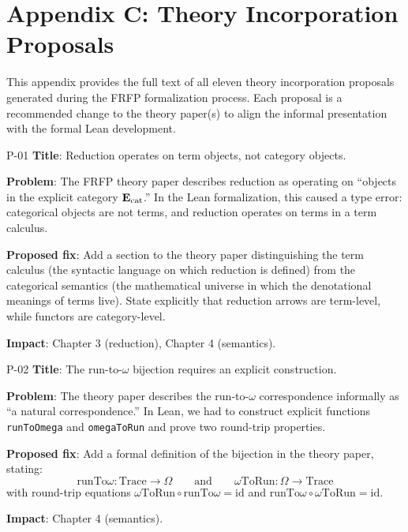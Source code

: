 \section{Appendix C: Theory Incorporation Proposals}
\label{app:proposals}

This appendix provides the full text of all eleven theory incorporation proposals
generated during the FRFP formalization process. Each proposal is a recommended
change to the theory paper(s) to align the informal presentation with the formal
Lean development.

\begin{proposal}{P-01}
\textbf{Title}: Reduction operates on term objects, not category objects.

\noindent\textbf{Problem}: The FRFP theory paper describes reduction as operating
on ``objects in the explicit category $\mathbf{E}_{\mathrm{cat}}$.'' In the Lean formalization, this
caused a type error: categorical objects are not terms, and reduction operates on
terms in a term calculus.

\noindent\textbf{Proposed fix}: Add a section to the theory paper distinguishing
the term calculus (the syntactic language on which reduction is defined) from the
categorical semantics (the mathematical universe in which the denotational
meanings of terms live). State explicitly that reduction arrows are term-level,
while functors are category-level.

\noindent\textbf{Impact}: Chapter 3 (reduction), Chapter 4 (semantics).
\end{proposal}

\begin{proposal}{P-02}
\textbf{Title}: The run-to-$\omega$ bijection requires an explicit construction.

\noindent\textbf{Problem}: The theory paper describes the run-to-$\omega$
correspondence informally as ``a natural correspondence.'' In Lean, we had to
construct explicit functions \texttt{runToOmega} and \texttt{omegaToRun} and
prove two round-trip properties.

\noindent\textbf{Proposed fix}: Add a formal definition of the bijection in the
theory paper, stating:
\[
\mathrm{runTo}\omega : \mathrm{Trace} \to \Omega
\qquad \text{and} \qquad
\omega\mathrm{ToRun} : \Omega \to \mathrm{Trace}
\]
with round-trip equations $\omega\mathrm{ToRun} \circ \mathrm{runTo}\omega = \mathrm{id}$
and $\mathrm{runTo}\omega \circ \omega\mathrm{ToRun} = \mathrm{id}$.

\noindent\textbf{Impact}: Chapter 4 (semantics).
\end{proposal}

